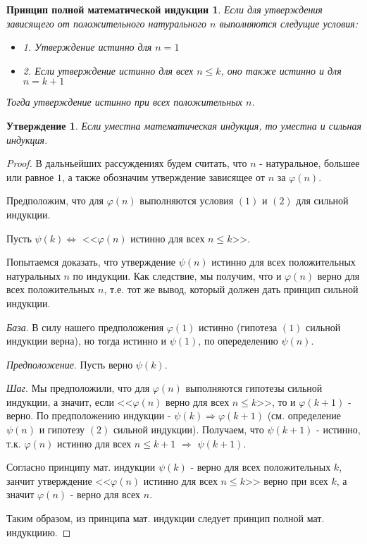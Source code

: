 \documentclass[a4paper,12pt]{article}
\newtheorem*{Full_induction_def} {Принцип полной математической индукции}
\newtheorem*{state}{Утверждение}
\renewcommand{\phi}{\varphi}
\begin{document}
	\begin{Full_induction_def}
		Если для утверждения зависящего от положительного натурального $n$ выполняются следущие условия:
		\begin{itemize}
			\item 1. Утверждение истинно для $n = 1$
			\item 2. Если утверждение истинно для всех $n \leqslant k$, оно также истинно и для $n = k + 1$
		\end{itemize}
		Тогда утверждение истинно при всех положительных $n$.
	\end{Full_induction_def}
	\begin{state} 
		Если уместна математическая индукция, то уместна и сильная индукция.
	\end{state}
	\begin{proof}
		В дальньейших рассуждениях будем считать, что $n$ - натуральное, большее или равное $1$, а также обозначим утверждение зависящее от $n$ за $\phi(n)$.

		Предположим, что для $\phi(n)$ выполняются условия $(1)$ и $(2)$ для сильной индукции.

		Пусть $\psi(k) \Leftrightarrow $ <<$\phi(n)$ истинно для всех $n \leqslant k$>>.

		Попытаемся доказать, что утверждение $\psi(n)$ истинно для всех положительных натуральных $n$ по индукции. Как следствие, мы получим, что и $\phi(n)$ верно для всех положительных $n$, т.е. тот же вывод, который должен дать принцип сильной индукции.

		\textit{База}. В силу нашего предположения $\phi(1)$ истинно (гипотеза $(1)$ сильной индукции верна), но тогда истинно и $\psi(1)$, по опеределению $\psi(n)$.

		\textit{Предположение}. Пусть верно $\psi(k)$.

		\textit{Шаг}. Мы предположили, что для $\phi(n)$ выполняются гипотезы сильной индукции, а значит, если <<$\phi(n)$ верно для всех $n \leqslant k$>>, то и $\phi(k + 1)$ - верно. По предположению индукции - $\psi(k) \Rightarrow \phi(k + 1)$ (см. определение $\psi(n)$ и гипотезу $(2)$ сильной индукции). Получаем, что $\psi(k + 1)$ - истинно, т.к. $\phi(n)$ истинно для всех $n \leqslant k + 1$ $\Rightarrow$ $\psi(k + 1)$.

		Согласно принципу мат. индукции $\psi(k)$ - верно для всех положительных $k$, занчит утверждение <<$\phi(n)$ истинно для всех $n \leqslant k$>> верно при всех $k$, а значит $\phi(n)$ - верно для всех $n$.

		Таким образом, из принципа мат. индукции следует принцип полной мат. индукциию.  
 	\end{proof}
\end{document}

